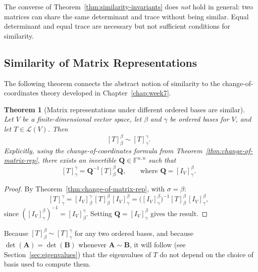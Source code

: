 \documentclass[11pt, a4paper, notitlepage]{report}
\newtheorem{theorem}{Theorem}[section]
\theoremstyle{definition}
\theoremstyle{remark}
\begin{document}
\begin{warning}[title={Warning: Similarity Is Stronger Than Equal Det/Trace}]
The converse of Theorem~\ref{thm:similarity-invariants} does \emph{not} hold in general:
two matrices can share the same determinant and trace without being similar.
Equal determinant and equal trace are necessary but not sufficient conditions for similarity.
\end{warning}

\subsection{Similarity of Matrix Representations}

The following theorem connects the abstract notion of similarity to the change-of-coordinates
theory developed in Chapter~\ref{chap:week7}.

\begin{theorem}[Matrix representations under different ordered bases are similar]\label{thm:similarity-of-reps}
Let $V$ be a finite-dimensional vector space, let $\beta$ and $\gamma$ be ordered bases for
$V$, and let $T \in \mathcal{L}(V)$. Then
\[
  [T]_\beta^\beta \sim [T]_\gamma^\gamma.
\]
Explicitly, using the change-of-coordinates formula from Theorem~\ref{thm:change-of-matrix-rep},
there exists an invertible $\mathbf{Q} \in \mathbb{F}^{n,n}$ such that
\[
  [T]_\gamma^\gamma = \mathbf{Q}^{-1}[T]_\beta^\beta\,\mathbf{Q},
  \qquad \text{where } \mathbf{Q} = [I_V]_\gamma^\beta.
\]
\end{theorem}

\begin{proof}
By Theorem~\ref{thm:change-of-matrix-rep}, with $\sigma = \beta$:
\[
  [T]_\gamma^\gamma
  = [I_V]_\beta^\gamma\,[T]_\beta^\beta\,[I_V]_\gamma^\beta
  = \bigl([I_V]_\gamma^\beta\bigr)^{-1}[T]_\beta^\beta\,[I_V]_\gamma^\beta,
\]
since $([I_V]_\gamma^\beta)^{-1} = [I_V]_\beta^\gamma$. Setting $\mathbf{Q} = [I_V]_\gamma^\beta$
gives the result.
\end{proof}

\begin{keyresult}[title={Key Result: Basis-Independence of Eigenvalues (Preview)}]
Because $[T]_\beta^\beta \sim [T]_\gamma^\gamma$ for any two ordered bases, and because
$\det(\mathbf{A}) = \det(\mathbf{B})$ whenever $\mathbf{A} \sim \mathbf{B}$, it will follow
(see Section~\ref{sec:eigenvalues}) that the eigenvalues of $T$ do not depend on the choice
of basis used to compute them.
\end{keyresult}
\end{document}
